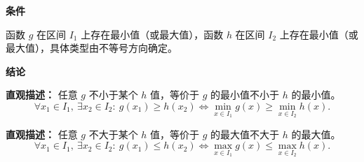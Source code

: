 \begin{statementbox}
	\textbf{\textcolor{CStatement}{条件}}
	\begin{description}[style=nextline, leftmargin=2.8em, labelsep=0.5em, itemsep=0.35em]
		\item[\textbf{\textcolor{CStatement}{条件1（存在最值）：}}] 函数 $g$ 在区间 $I_1$ 上存在最小值（或最大值），函数 $h$ 在区间 $I_2$ 上存在最小值（或最大值），具体类型由不等号方向确定。
	\end{description}

	\textbf{\textcolor{CStatement}{结论}}
	\begin{description}[style=nextline, leftmargin=2.8em, labelsep=0.5em, itemsep=0.45em]
		\item[\textbf{\textcolor{CStatement}{结论一（最小值转化）：}}]
			\textbf{\textcolor{CStatement}{直观描述：}}
			任意 $g$ 不小于某个 $h$ 值，等价于 $g$ 的最小值不小于 $h$ 的最小值。
			\[
				\forall x_1\in I_1,\ \exists x_2\in I_2:\ g(x_1)\ge h(x_2) \Longleftrightarrow \min_{x\in I_1} g(x) \ge \min_{x\in I_2} h(x).
			\]

		\item[\textbf{\textcolor{CStatement}{推广结论（最大值转化）：}}]
			\textbf{\textcolor{CStatement}{直观描述：}}
			任意 $g$ 不大于某个 $h$ 值，等价于 $g$ 的最大值不大于 $h$ 的最大值。
			\[
				\forall x_1\in I_1,\ \exists x_2\in I_2:\ g(x_1)\le h(x_2) \Longleftrightarrow \max_{x\in I_1} g(x) \le \max_{x\in I_2} h(x).
			\]
	\end{description}
\end{statementbox}
